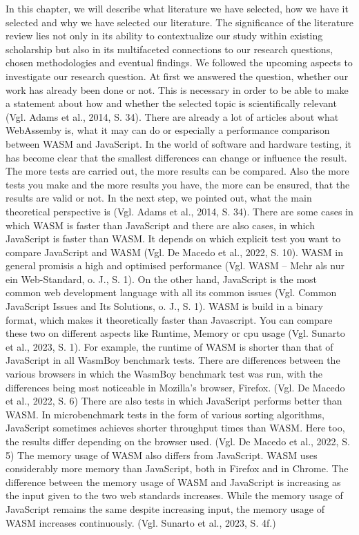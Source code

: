 In this chapter, we will describe what literature we have selected, how we have it selected and why we have selected our literature. 
The significance of the literature review lies not only in its ability to contextualize our study within existing scholarship but also in its multifaceted connections to our research questions, chosen methodologies and eventual findings. We followed the upcoming aspects to investigate our research question.
At first we answered the question, whether our work has already been done or not. This is necessary in order to be able to make a statement about how and whether the selected topic is scientifically relevant (Vgl. Adams et al., 2014, S. 34). There are already a lot of articles about what WebAssemby is, what it may can do or especially a performance comparison between WASM and JavaScript. In the world of software and hardware testing, it has become clear that the smallest differences can change or influence the result. The more tests are carried out, the more results can be compared. Also the more tests you make and the more results you have, the more can be ensured, that the results are valid or not.
In the next step, we pointed out, what the main theoretical perspective is (Vgl. Adams et al., 2014, S. 34). There are some cases in which WASM is faster than JavaScript and there are also cases, in which JavaScript is faster than WASM. It depends on which explicit test you want to compare JavaScript and WASM (Vgl. De Macedo et al., 2022, S. 10). WASM in general promisis a high and optimised performance (Vgl. WASM – Mehr als nur ein Web-Standard, o. J., S. 1). On the other hand, JavaScript is the most common web development language with all its common issues (Vgl. Common JavaScript Issues and Its Solutions, o. J., S. 1). WASM is build in a binary format, which makes it theoretically faster than Javascript. You can compare these two  on different aspects like Runtime, Memory or cpu usage (Vgl. Sunarto et al., 2023, S. 1). For example, the runtime of WASM is shorter than that of JavaScript in all WasmBoy benchmark tests. There are differences between the various browsers in which the WasmBoy benchmark test was run, with the differences being most noticeable in Mozilla's browser, Firefox. (Vgl. De Macedo et al., 2022, S. 6) There are also tests in which JavaScript performs better than WASM. In microbenchmark tests in the form of various sorting algorithms, JavaScript sometimes achieves shorter throughput times than WASM. Here too, the results differ depending on the browser used. (Vgl. De Macedo et al., 2022, S. 5) The memory usage of WASM also differs from JavaScript. WASM uses considerably more memory than JavaScript, both in Firefox and in Chrome. The difference between the memory usage of WASM and JavaScript is increasing as the input given to the two web standards increases. While the memory usage of JavaScript remains the same despite increasing input, the memory usage of WASM increases continuously. (Vgl. Sunarto et al., 2023, S. 4f.)
